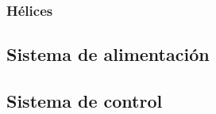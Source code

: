 \documentclass[12pt,twoside]{article}
\begin{document}
			
			\subsubsection{Hélices}\label{subsubsec:propellers}
			
		
		\subsection{Sistema de alimentación}\label{subsec:alimentacion}
		
		
		\subsection{Sistema de control}\label{subsec:control}


  \newpage
  
  
\end{document}
